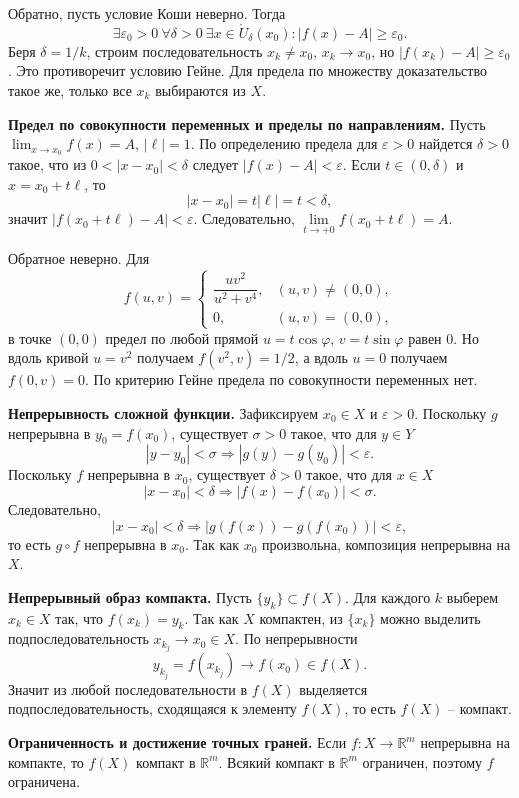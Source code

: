 \documentclass[12pt,a4paper]{article}
\newcommand{\R}{\mathbb{R}}
\newcommand{\eps}{\varepsilon}
\newcommand{\PBall}[2]{\mathring U_{#1}(#2)}
\begin{document}
Обратно, пусть условие Коши неверно. Тогда
\[
  \exists\eps_0>0\ \forall\delta>0\ \exists x\in\PBall{\delta}{x_0}:
  |f(x)-A|\ge\eps_0.
\]
Беря \(\delta=1/k\), строим последовательность \(x_k\ne x_0\), \(x_k\to x_0\),
но \(|f(x_k)-A|\ge\eps_0\). Это противоречит условию Гейне. Для предела по
множеству доказательство такое же, только все \(x_k\) выбираются из \(X\).

\textbf{Предел по совокупности переменных и пределы по направлениям.}
Пусть \(\lim_{x\to x_0}f(x)=A\), \(|\ell|=1\). По определению предела для
\(\eps>0\) найдется \(\delta>0\) такое, что из \(0<|x-x_0|<\delta\) следует
\(|f(x)-A|<\eps\). Если \(t\in(0,\delta)\) и \(x=x_0+t\ell\), то
\[
  |x-x_0|=t|\ell|=t<\delta,
\]
значит \(|f(x_0+t\ell)-A|<\eps\). Следовательно,
\(\lim\limits_{t\to+0}f(x_0+t\ell)=A\).

Обратное неверно. Для
\[
  f(u,v)=
  \begin{cases}
    \dfrac{uv^2}{u^2+v^4}, & (u,v)\ne(0,0),\\[0.8em]
    0, & (u,v)=(0,0),
  \end{cases}
\]
в точке \((0,0)\) предел по любой прямой \(u=t\cos\varphi\),
\(v=t\sin\varphi\) равен \(0\). Но вдоль кривой \(u=v^2\) получаем
\(f(v^2,v)=1/2\), а вдоль \(u=0\) получаем \(f(0,v)=0\). По критерию Гейне
предела по совокупности переменных нет.

\textbf{Непрерывность сложной функции.}
Зафиксируем \(x_0\in X\) и \(\eps>0\). Поскольку \(g\) непрерывна в
\(y_0=f(x_0)\), существует \(\sigma>0\) такое, что для \(y\in Y\)
\[
  |y-y_0|<\sigma \Rightarrow |g(y)-g(y_0)|<\eps.
\]
Поскольку \(f\) непрерывна в \(x_0\), существует \(\delta>0\) такое, что для
\(x\in X\)
\[
  |x-x_0|<\delta \Rightarrow |f(x)-f(x_0)|<\sigma.
\]
Следовательно,
\[
  |x-x_0|<\delta
  \Rightarrow
  |g(f(x))-g(f(x_0))|<\eps,
\]
то есть \(g\circ f\) непрерывна в \(x_0\). Так как \(x_0\) произвольна,
композиция непрерывна на \(X\).

\textbf{Непрерывный образ компакта.}
Пусть \(\{y_k\}\subset f(X)\). Для каждого \(k\) выберем \(x_k\in X\) так, что
\(f(x_k)=y_k\). Так как \(X\) компактен, из \(\{x_k\}\) можно выделить
подпоследовательность \(x_{k_j}\to x_0\in X\). По непрерывности
\[
  y_{k_j}=f(x_{k_j})\to f(x_0)\in f(X).
\]
Значит из любой последовательности в \(f(X)\) выделяется подпоследовательность,
сходящаяся к элементу \(f(X)\), то есть \(f(X)\) -- компакт.

\textbf{Ограниченность и достижение точных граней.}
Если \(f:X\to\R^m\) непрерывна на компакте, то \(f(X)\) компакт в \(\R^m\).
Всякий компакт в \(\R^m\) ограничен, поэтому \(f\) ограничена.
\end{document}
